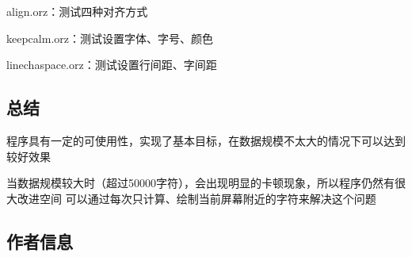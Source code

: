 \begin{DoxyEnumerate}
\item {\ttfamily align.\+orz}：测试四种对齐方式
\item {\ttfamily keepcalm.\+orz}：测试设置字体、字号、颜色
\item {\ttfamily linechaspace.\+orz}：测试设置行间距、字间距
\end{DoxyEnumerate}

\subsection*{总结 }


\begin{DoxyEnumerate}
\item 程序具有一定的可使用性，实现了基本目标，在数据规模不太大的情况下可以达到较好效果
\item 当数据规模较大时（超过50000字符），会出现明显的卡顿现象，所以程序仍然有很大改进空间 可以通过每次只计算、绘制当前屏幕附近的字符来解决这个问题
\end{DoxyEnumerate}

\subsection*{作者信息 }



